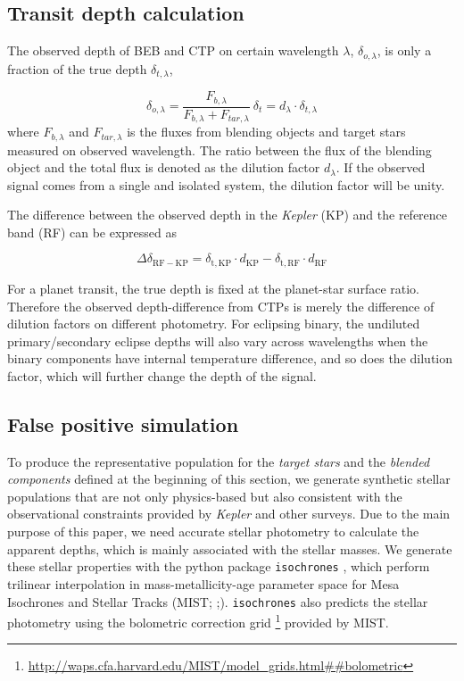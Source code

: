 \documentclass{aastex63}
\begin{document}
\subsection{Transit depth calculation}
\label{framework}

The observed depth of BEB and CTP on certain wavelength $\lambda$, $\delta_{o,\lambda}$, is only a fraction of the true depth $\delta_{t,\lambda}$,

\begin{equation}
\label{eq:diluteddepth}
    \delta_{o,\lambda} = \frac{F_{b,\lambda}}{F_{b,\lambda}+F_{tar,\lambda}}~\delta_t = d_{\lambda} \cdot \delta_{t,\lambda}
\end{equation}
where $F_{b,\lambda}$ and $F_{tar,\lambda}$ is the fluxes from blending objects and target stars measured on observed wavelength. The ratio between the flux of the blending object and the total flux is denoted as the dilution factor $d_{\lambda}$. If the observed signal comes from a single and isolated system, the dilution factor will be unity. 

The difference between the observed depth in the \emph{Kepler} (KP) and the reference band (RF) can be expressed as

\begin{equation}
\label{eq:depthdifference}
    \Delta \delta_\mathrm{RF-KP} = \delta_\mathrm{t,KP} \cdot d_\mathrm{KP} - \delta_\mathrm{t,RF} \cdot d_\mathrm{RF}
\end{equation}

For a planet transit, the true depth is fixed at the planet-star surface ratio. Therefore the observed depth-difference from CTPs is merely the difference of dilution factors on different photometry. For eclipsing binary, the undiluted primary/secondary eclipse depths will also vary across wavelengths when the binary components have internal temperature difference, and so does the dilution factor, which will further change the depth of the signal.

\subsection{False positive simulation}

To produce the representative population for the \emph{target stars} and the \emph{blended components} defined at the beginning of this section, we generate synthetic stellar populations that are not only physics-based but also consistent with the observational constraints provided by \emph{Kepler} and other surveys. Due to the main purpose of this paper, we need accurate stellar photometry to calculate the apparent depths, which is mainly associated with the stellar masses. We generate these stellar properties with the python package \texttt{isochrones} \citep{2015ascl.soft03010M}, which perform trilinear interpolation in mass-metallicity-age parameter space for Mesa Isochrones and Stellar Tracks (MIST; \cite{Choi2016};\cite{Dotter2016}). \texttt{isochrones} also predicts the stellar photometry using the bolometric correction grid \footnote{\url{http://waps.cfa.harvard.edu/MIST/model_grids.html##bolometric}} provided by MIST. 
\end{document}
